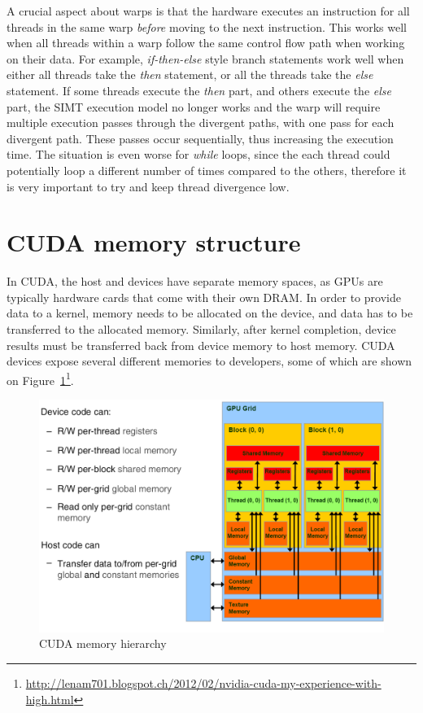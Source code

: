 \documentclass[12pt, a4paper]{report}
\begin{document}
\begin{sloppypar}
A crucial aspect about warps is that the hardware executes an instruction for
all threads in the same warp \emph{before} moving to the next instruction.
This works well when all threads within a warp follow the same control flow path
when working on their data.
For example, \emph{if-then-else} style branch statements work well when either
all threads take the \emph{then} statement, or all the threads take the
\emph{else} statement.
If some threads execute the \emph{then} part, and others execute the \emph{else}
part, the SIMT execution model no longer works and the warp will require
multiple execution passes through the divergent paths, with one pass for each
divergent path.
These passes occur sequentially, thus increasing the execution time.
The situation is even worse for \emph{while} loops, since the each thread could
potentially loop a different number of times compared to the others, therefore
it is very important to try and keep thread divergence low.

\section{CUDA memory structure}
In CUDA, the host and devices have separate memory spaces, as GPUs are typically
hardware cards that come with their own DRAM.
In order to provide data to a kernel, memory needs to be allocated on the
device, and data has to be transferred to the allocated memory.
Similarly, after kernel completion, device results must be transferred back from
device memory to host memory.
CUDA devices expose several different memories to developers, some of which are
shown on Figure~\ref{fig:cuda_memory_hierarchy}\footnote{\url{http://lenam701.blogspot.ch/2012/02/nvidia-cuda-my-experience-with-high.html}}.

\begin{figure}[h]
\centering
\includegraphics[scale=0.35]{figs/cuda_memory_hierarchy}
\caption{CUDA memory hierarchy}
\label{fig:cuda_memory_hierarchy}
\end{figure}


\end{sloppypar}
\end{document}

